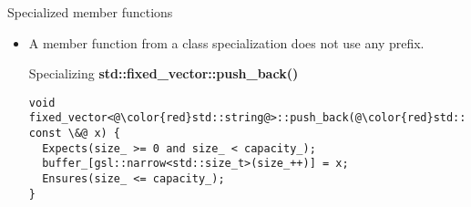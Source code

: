 \begin{frame}[t,fragile]{Specialized member functions}
\begin{itemize}
  \item A member function from a class specialization does not use any
         prefix.

\begin{block}{Specializing \textbf{std::fixed\_vector::push\_back()}}
\begin{lstlisting}[escapechar=@]
void fixed_vector<@\color{red}std::string@>::push_back(@\color{red}std::string const \&@ x) {
  Expects(size_ >= 0 and size_ < capacity_);
  buffer_[gsl::narrow<std::size_t>(size_++)] = x;
  Ensures(size_ <= capacity_);
}
\end{lstlisting}
\end{block}
\end{itemize}
\end{frame}
